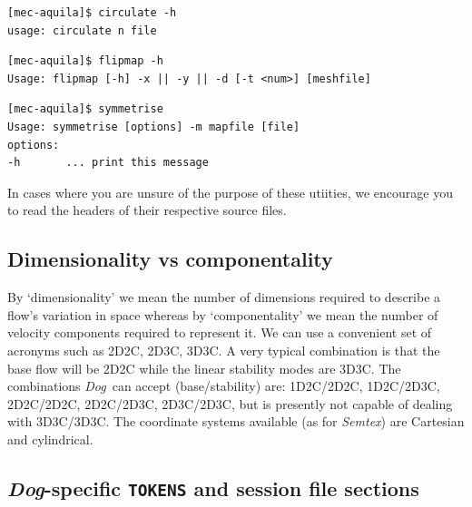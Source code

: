 \documentclass[11pt,a4paper]{report}
\newcommand{\Semtex}{\emph{Semtex}}
\newcommand{\Dog}{\emph{Dog}}
\begin{document}
{\small
\begin{verbatim}
[mec-aquila]$ circulate -h
usage: circulate n file
\end{verbatim}
}

{\small
\begin{verbatim}
[mec-aquila]$ flipmap -h
Usage: flipmap [-h] -x || -y || -d [-t <num>] [meshfile]
\end{verbatim}
}

{\small
\begin{verbatim}
[mec-aquila]$ symmetrise
Usage: symmetrise [options] -m mapfile [file]
options:
-h       ... print this message
\end{verbatim}
}

In cases where you are unsure of the purpose of these utiities, we
encourage you to read the headers of their respective source files.

\subsection{Dimensionality vs componentality}

By `dimensionality' we mean the number of dimensions required to
describe a flow's variation in space whereas by `componentality' we
mean the number of velocity components required to represent it.  We
can use a convenient set of acronyms such as 2D2C, 2D3C, 3D3C.  A very
typical combination is that the base flow will be 2D2C while the
linear stability modes are 3D3C.  The combinations \Dog\ can accept
(base/stability) are: 1D2C/2D2C, 1D2C/2D3C, 2D2C/2D2C, 2D2C/2D3C,
2D3C/2D3C, but is presently not capable of dealing with 3D3C/3D3C.
The coordinate systems available (as for \Semtex) are Cartesian and
cylindrical.  \citep[One might anticipate that 1D2C/2D3C analyses are
  not very useful owing to Squire's theorem for stability of `parallel
  shear flows', see e.g.][but Squire's theorem does not hold in
  cylindrical coordinates.]{schmid01}

\subsection{\Dog-specific \texttt{TOKENS} and session file sections}
\label{sec.specific}
\end{document}
